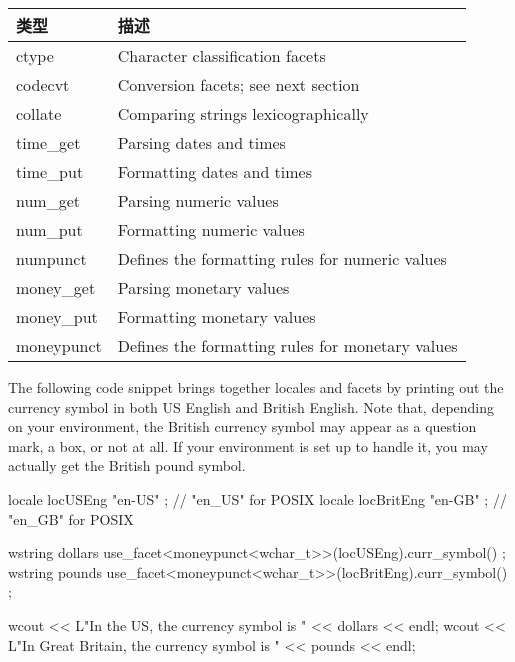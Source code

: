\begin{longtable}{|l|l|}
\hline
\textbf{类型} & \textbf{描述}                             \\ \hline
\endfirsthead
%
\endhead
%
ctype          & Character classification facets                  \\ \hline
codecvt        & Conversion facets; see next section              \\ \hline
collate        & Comparing strings lexicographically              \\ \hline
time\_get      & Parsing dates and times                          \\ \hline
time\_put      & Formatting dates and times                       \\ \hline
num\_get       & Parsing numeric values                           \\ \hline
num\_put       & Formatting numeric values                        \\ \hline
numpunct       & Defines the formatting rules for numeric values  \\ \hline
money\_get     & Parsing monetary values                          \\ \hline
money\_put     & Formatting monetary values                       \\ \hline
moneypunct     & Defines the formatting rules for monetary values \\ \hline
\end{longtable}

The following code snippet brings together locales and facets by printing out the currency symbol in both US English and British English. Note that, depending on your environment, the British currency symbol may appear as a question mark, a box, or not at all. If your environment is set up to handle it, you may actually get the British pound symbol.

\begin{cpp}
locale locUSEng { "en-US" }; // "en_US" for POSIX
locale locBritEng { "en-GB" }; // "en_GB" for POSIX

wstring dollars { use_facet<moneypunct<wchar_t>>(locUSEng).curr_symbol() };
wstring pounds { use_facet<moneypunct<wchar_t>>(locBritEng).curr_symbol() };

wcout << L"In the US, the currency symbol is " << dollars << endl;
wcout << L"In Great Britain, the currency symbol is " << pounds << endl;
\end{cpp}

